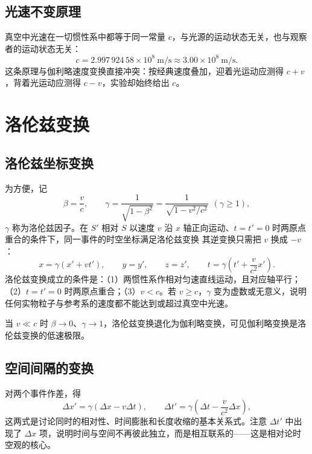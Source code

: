     \subsection{光速不变原理}
    真空中光速在一切惯性系中都等于同一常量 $c$，与光源的运动状态无关，也与观察者的运动状态无关：
    \[
    c=2.997\,924\,58\times10^{8}\ \mathrm{m/s}\approx 3.00\times10^{8}\ \mathrm{m/s}.
    \]
    这条原理与伽利略速度变换直接冲突：按经典速度叠加，迎着光运动应测得 $c+v$，背着光运动应测得 $c-v$，实验却始终给出 $c$。


\section{洛伦兹变换}
    \subsection{洛伦兹坐标变换}
    为方便，记
    \[
    \beta=\frac{v}{c},\qquad \gamma=\frac{1}{\sqrt{1-\beta^{2}}}=\frac{1}{\sqrt{1-v^{2}/c^{2}}}\ \ (\gamma\ge 1),
    \]
    $\gamma$ 称为洛伦兹因子。在 $S'$ 相对 $S$ 以速度 $v$ 沿 $x$ 轴正向运动、$t=t'=0$ 时两原点重合的条件下，同一事件的时空坐标满足洛伦兹变换
    其逆变换只需把 $v$ 换成 $-v$：
    \[
    x=\gamma(x'+vt'),\qquad y=y',\qquad z=z',\qquad t=\gamma\left(t'+\frac{v}{c^{2}}x'\right).
    \]
    洛伦兹变换成立的条件是：（1）两惯性系作相对匀速直线运动，且对应轴平行；（2）$t=t'=0$ 时两原点重合；（3）$v<c$。若 $v\ge c$，$\gamma$ 变为虚数或无意义，说明任何实物粒子与参考系的速度都不能达到或超过真空中光速。

    当 $v\ll c$ 时 $\beta\to 0$、$\gamma\to 1$，洛伦兹变换退化为伽利略变换，可见伽利略变换是洛伦兹变换的低速极限。

    \subsection{空间间隔的变换}
    对两个事件作差，得
    \[
    \Delta x'=\gamma(\Delta x-v\Delta t),\qquad \Delta t'=\gamma\left(\Delta t-\frac{v}{c^{2}}\Delta x\right),
    \]
    这两式是讨论同时的相对性、时间膨胀和长度收缩的基本关系式。注意 $\Delta t'$ 中出现了 $\Delta x$ 项，说明时间与空间不再彼此独立，而是相互联系的——这是相对论时空观的核心。

